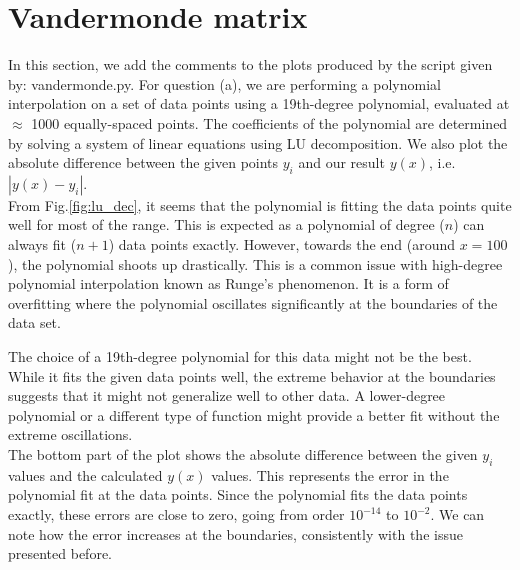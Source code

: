 \section{Vandermonde matrix}
%

In this section, we add the comments to the plots produced by the script given by: vandermonde.py.
For question (a), we are performing a polynomial interpolation on a set of data points using a 19th-degree polynomial, evaluated at $\approx$ 1000 equally-spaced points. The coefficients of the polynomial are determined by solving a system of linear equations using LU decomposition. We also plot the absolute difference between the given points $y_{i}$ and our result $y(x)$, i.e. $|y(x) - y_{i}|$. \\

From Fig.\ref{fig:lu_dec}, it seems that the polynomial is fitting the data points quite well for most of the range. This is expected as a polynomial of degree ($n$) can always fit ($n+1$) data points exactly. However, towards the end (around $x=100$), the polynomial shoots up drastically. This is a common issue with high-degree polynomial interpolation known as Runge's phenomenon. It is a form of overfitting where the polynomial oscillates significantly at the boundaries of the data set.

The choice of a 19th-degree polynomial for this data might not be the best. While it fits the given data points well, the extreme behavior at the boundaries suggests that it might not generalize well to other data. A lower-degree polynomial or a different type of function might provide a better fit without the extreme oscillations. \\

The bottom part of the plot shows the absolute difference between the given $y_{i}$ values and the calculated $y(x)$ values. This represents the error in the polynomial fit at the data points. Since the polynomial fits the data points exactly, these errors are close to zero, going from order $10^{-14}$ to $10^{-2}$. We can note how the error increases at the boundaries, consistently with the issue presented before. \\

